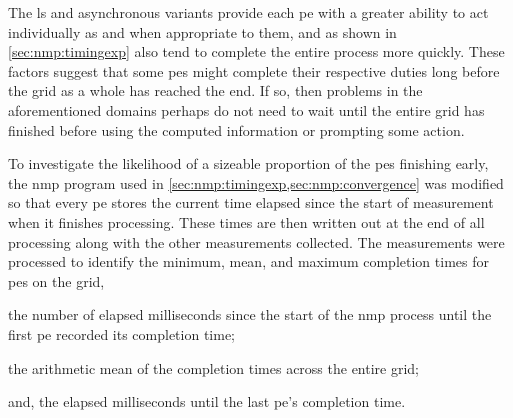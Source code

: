 The \gls{ls} and asynchronous variants provide each \gls{pe} with a greater ability to act individually as and when appropriate to them, and as shown in \cref{sec:nmp:timingexp} also tend to complete the entire process more quickly.  These factors suggest that some \glspl{pe} might complete their respective duties long before the grid as a whole has reached the end.  If so, then problems in the aforementioned domains perhaps do not need to wait until the entire grid has finished before using the computed information or prompting some action.

To investigate the likelihood of a sizeable proportion of the \glspl{pe} finishing early, the \gls{nmp} program used in \cref{sec:nmp:timingexp,sec:nmp:convergence} was modified so that every \gls{pe} stores the current time elapsed since the start of measurement when it finishes processing.  These times are then written out at the end of all processing along with the other measurements collected.  The measurements were processed to identify the minimum, mean, and maximum completion times for \glspl{pe} on the grid, \ie{}
\begin{inparablank}
\item the number of elapsed milliseconds since the start of the \gls{nmp} process until the first \gls{pe} recorded its completion time;
\item the arithmetic mean of the completion times across the entire grid;
\item and, the elapsed milliseconds until the last \gls{pe}'s completion time.
\end{inparablank}

